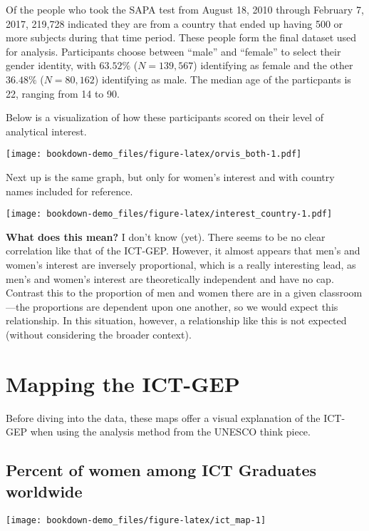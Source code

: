 \documentclass[]{book}
\begin{document}
Of the people who took the SAPA test from August 18, 2010 through
February 7, 2017, 219,728 indicated they are from a country that ended
up having 500 or more subjects during that time period. These people
form the final dataset used for analysis. Participants choose between
``male'' and ``female'' to select their gender identity, with
\(63.52\%\) (\(N = 139,567\)) identifying as female and the other
\(36.48\%\) (\(N = 80,162\)) identifying as male. The median age of the
particpants is 22, ranging from 14 to 90.

Below is a visualization of how these participants scored on their level
of analytical interest.

\texttt{[image: bookdown-demo\_files/figure-latex/orvis\_both-1.pdf]}

Next up is the same graph, but only for women's interest and with
country names included for reference.

\texttt{[image: bookdown-demo\_files/figure-latex/interest\_country-1.pdf]}

\textbf{What does this mean?} I don't know (yet). There seems to be no
clear correlation like that of the ICT-GEP. However, it almost appears
that men's and women's interest are inversely proportional, which is a
really interesting lead, as men's and women's interest are theoretically
independent and have no cap. Contrast this to the proportion of men and
women there are in a given classroom---the proportions are dependent
upon one another, so we would expect this relationship. In this
situation, however, a relationship like this is not expected (without
considering the broader context).

\chapter{Mapping the ICT-GEP}\label{maps}

Before diving into the data, these maps offer a visual explanation of
the ICT-GEP when using the analysis method from the UNESCO think piece.

\section{Percent of women among ICT Graduates
worldwide}\label{percent-of-women-among-ict-graduates-worldwide}

\begin{center}\texttt{[image: bookdown-demo\_files/figure-latex/ict\_map-1]} \end{center}
\end{document}
